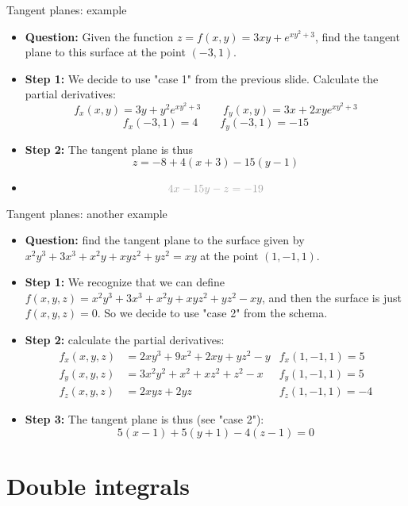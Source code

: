 \begin{frame}{Tangent planes: example}
    \begin{itemize}
        \item
            \textbf{Question:} Given the function $z=f(x,y)=3xy+e^{xy^2+3}$, find the tangent plane to this surface at the point $(-3,1)$.
        \item \textbf{Step 1:} We decide to use "case 1" from the previous slide. Calculate the partial derivatives:
            \[f_x(x,y)=3y+y^2e^{xy^2+3}  \qquad  f_y(x,y)=3x+2xye^{xy^2+3}\]
            \[f_x(-3,1)=4 \qquad f_y(-3,1)=-15\]
        \item \textbf{Step 2:}
            The tangent plane is thus
            \[\boxed{z=-8+4(x+3)-15(y-1)}\]
        \item {}
            \[{\gray{4x-15y-z=-19}}\]
    \end{itemize}
\end{frame}

\begin{frame}{Tangent planes: another example}
    \begin{itemize}
        \item
            \textbf{Question:} find the tangent plane to the surface given by $x^2y^3+3x^3+x^2y+xyz^2+yz^2=xy$ at the point $(1,-1,1)$.
        \item \textbf{Step 1:}  We recognize that we can define $f(x,y,z)=x^2y^3+3x^3+x^2y+xyz^2+yz^2-xy$, and then the surface is just $f(x,y,z)=0$. So we decide to use "case 2" from the schema.
        \item \textbf{Step 2:} calculate the partial derivatives:
            \begin{align*}
                f_x(x,y,z)&=2xy^3+9x^2+2xy+yz^2-y & f_x(1,-1,1)=5\\
                f_y(x,y,z)&=3x^2y^2+x^2+xz^2+z^2-x & f_y(1,-1,1)=5\\
                f_z(x,y,z)&=2xyz+2yz & f_z(1,-1,1)=-4
            \end{align*}
        \item \textbf{Step 3:} The tangent plane is thus (see "case 2"):
            \[\boxed{5(x-1)+5(y+1)-4(z-1)=0}\]

    \end{itemize}
\end{frame}

\section{Double integrals}
